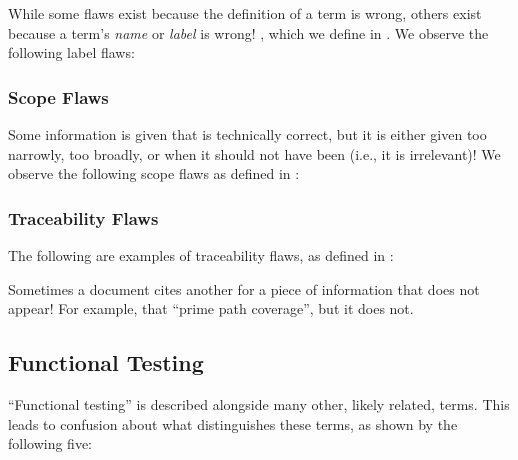 While some flaws exist because the definition of a term is wrong,
others exist because a term's \emph{name} or \emph{label} is wrong!
, which we define in .
We observe the following label flaws:



\subsubsection{Scope Flaws}\label{scope}

Some information is given that is technically correct, but it is either given
too narrowly, too broadly, or when it should not have been (i.e., it is
irrelevant)! We observe the following scope flaws as
defined in :



\subsubsection{Traceability Flaws}\label{trace}

\ifnotpaper
    The following are examples of traceability flaws, as defined in
    :
    
\else
    Sometimes a document cites another for a piece of information that does not
    appear! For example, \citet[p.~184]{DoğanEtAl2014} 
    that \citet{SakamotoEtAl2013}  ``prime path
    coverage'', but it does not.
\fi

\subsection{Functional Testing}\label{func-test-flaw}

``Functional testing'' is described alongside many other, likely related,
terms. This leads to confusion about what distinguishes these terms, as shown
by the following five:

